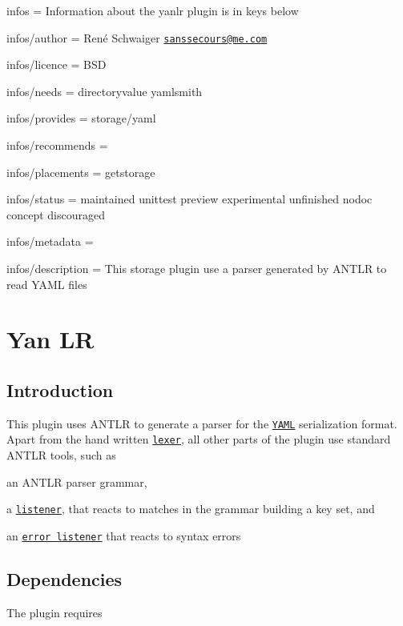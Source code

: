 
\begin{DoxyItemize}
\item infos = Information about the yanlr plugin is in keys below
\item infos/author = René Schwaiger \href{mailto:sanssecours@me.com}{\tt sanssecours@me.\+com}
\item infos/licence = B\+SD
\item infos/needs = directoryvalue yamlsmith
\item infos/provides = storage/yaml
\item infos/recommends =
\item infos/placements = getstorage
\item infos/status = maintained unittest preview experimental unfinished nodoc concept discouraged
\item infos/metadata =
\item infos/description = This storage plugin use a parser generated by A\+N\+T\+LR to read Y\+A\+ML files
\end{DoxyItemize}\hypertarget{autotoc_md897_src_plugins_yanlr_README_md}{}\section{Yan LR}\label{autotoc_md897_src_plugins_yanlr_README_md}
\hypertarget{autotoc_md897_autotoc_md898}{}\subsection{Introduction}\label{autotoc_md897_autotoc_md898}
This plugin uses A\+N\+T\+LR to generate a parser for the \href{http://yaml.org}{\tt Y\+A\+ML} serialization format. Apart from the hand written \href{/home/jenkins/workspace/libelektra-release/src/plugins/yanlr/yaml_lexer.cpp}{\tt lexer}, all other parts of the plugin use standard A\+N\+T\+LR tools, such as


\begin{DoxyItemize}
\item an A\+N\+T\+LR parser grammar,
\item a \href{/home/jenkins/workspace/libelektra-release/src/plugins/yanlr/listener.cpp}{\tt listener}, that reacts to matches in the grammar building a key set, and
\item an \href{/home/jenkins/workspace/libelektra-release/src/plugins/yanlr/error_listener.cpp}{\tt error listener} that reacts to syntax errors
\end{DoxyItemize}\hypertarget{autotoc_md897_autotoc_md899}{}\subsection{Dependencies}\label{autotoc_md897_autotoc_md899}
The plugin requires


